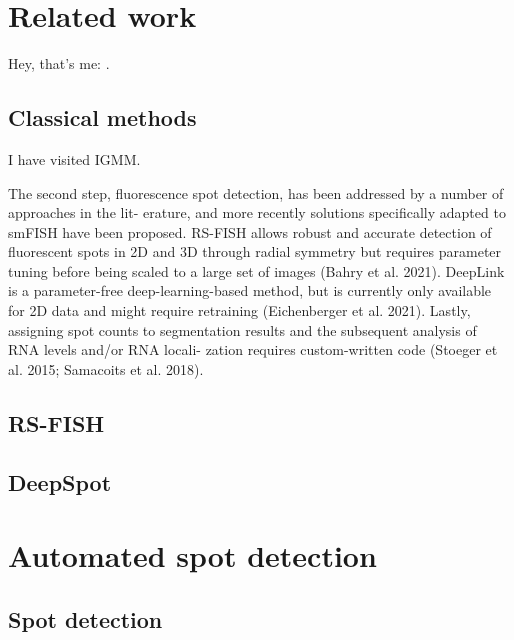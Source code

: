 \section{Related work}

Hey, that's me: \cite{imbert_fish-quant_2022}.

\subsection{Classical methods}

I have visited \ac{IGMM}.

The second step, fluorescence spot detection, has been addressed by a number
of approaches in the lit- erature, and more recently solutions specifically
adapted to smFISH have been proposed. RS-FISH allows robust and accurate detection
of fluorescent spots in 2D and 3D through radial symmetry but requires parameter
tuning before being scaled to a large set of images (Bahry et al. 2021). DeepLink
is a parameter-free deep-learning-based method, but is currently only available
for 2D data and might require retraining (Eichenberger et al. 2021). Lastly,
assigning spot counts to segmentation results and the subsequent analysis of
RNA levels and/or RNA locali- zation requires custom-written code (Stoeger et al. 2015; Samacoits et al. 2018).

\subsection{RS-FISH}

\subsection{DeepSpot}


\section{Automated spot detection}


\subsection{Spot detection}

